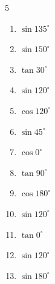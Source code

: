 \begin{multicols}{5}
\begin{enumerate}
  \item $\displaystyle \sin{135^\circ}$


  \item $\displaystyle \sin{150^\circ}$


  \item $\displaystyle \tan{30^\circ}$


  \item $\displaystyle \sin{120^\circ}$


  \item $\displaystyle \cos{120^\circ}$


  \item $\displaystyle \sin{45^\circ}$


  \item $\displaystyle \cos{0^\circ}$

        \phantom{$\displaystyle =1$}

  \item $\displaystyle \tan{90^\circ}$

        \phantom{$\displaystyle なし$}

  \item $\displaystyle \cos{180^\circ}$

        \phantom{$\displaystyle =-1$}

\columnbreak %

  \item $\displaystyle \sin{120^\circ}$


  \item $\displaystyle \tan{0^\circ}$

        \phantom{$\displaystyle =0$}

  \item $\displaystyle \sin{120^\circ}$


  \item $\displaystyle \sin{180^\circ}$


\end{enumerate}
\end{multicols}
